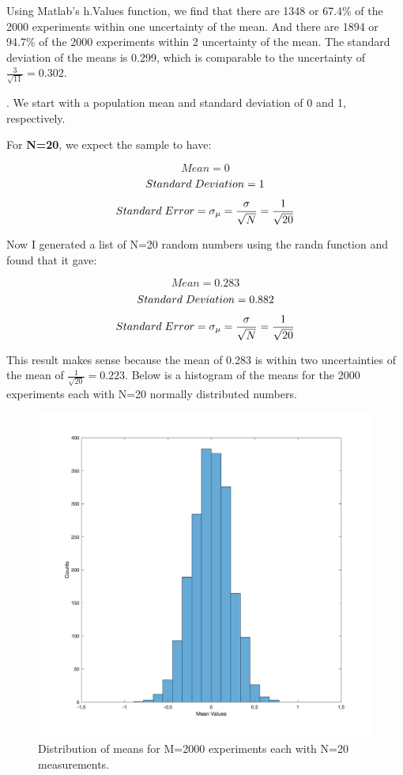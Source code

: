 \documentclass{article}
\begin{document}
 Using Matlab’s h.Values function, we find that there are 1348 or 67.4\% of the 2000 experiments within one uncertainty of the mean. And there are 1894 or 94.7\% of the 2000 experiments within 2 uncertainty of the mean. The standard deviation of the means is 0.299, which is comparable to the uncertainty of $\frac{3}{\sqrt{11}}=0.302$.   \newline
 
 
 . We start with a population mean and standard deviation of 0 and 1, respectively.
 
 For \textbf{N=20}, we expect the sample to have:
 
 \[ Mean=0\]
  \[ Standard\hspace{1mm}Deviation=1\]
   \[ Standard\hspace{1mm}Error=\sigma_{\mu}=\frac{\sigma}{\sqrt{N}}=\frac{1}{\sqrt{20}}\] 


Now I generated a list of N=20 random numbers using the randn function and found that it gave:

 \[ Mean=0.283\]
  \[ Standard\hspace{1mm}Deviation=0.882\]
   \[ Standard\hspace{1mm}Error=\sigma_{\mu}=\frac{\sigma}{\sqrt{N}}=\frac{1}{\sqrt{20}}\] 
   
   This result makes sense because the mean of 0.283 is within two uncertainties of the mean of $\frac{1}{\sqrt{20}}=0.223$. Below is a histogram of the means for the 2000 experiments each with N=20 normally distributed numbers.
 
   \begin{figure}[H]
  \centering
  \includegraphics[width=0.8\linewidth]{lateximages/Prob3_4_20.png}
  \caption{Distribution of means for M=2000 experiments each with N=20 measurements.}
  \label{fig:boat1}
  \end{figure}
  
\end{document}
